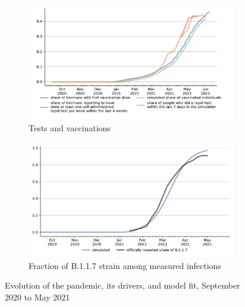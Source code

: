 \begin{figure}[!tp]
\begin{subfigure}[b]{0.475\textwidth}
        \includegraphics[width=\textwidth]{../figures/results/figures/scenario_comparisons/combined_fit/full_share_rapid_test_in_last_week_and_vaccinated}

        \caption{{\small Tests and vaccinations}}
        \label{fig:antigen_tests_vaccinations}
    \end{subfigure}
    \hfill
    \begin{subfigure}[b]{0.475\textwidth}
        \centering

        \includegraphics[width=\textwidth]{../figures/results/figures/scenario_comparisons/combined_fit/full_share_b117}

        \caption{Fraction of B.1.1.7 strain among measured infections}
        \label{fig:share_b117}
    \end{subfigure}

    \caption{Evolution of the pandemic, its drivers, and model fit, September 2020 to May 2021}
    \label{fig:pandemic_drivers_model_fit}


\end{figure}

